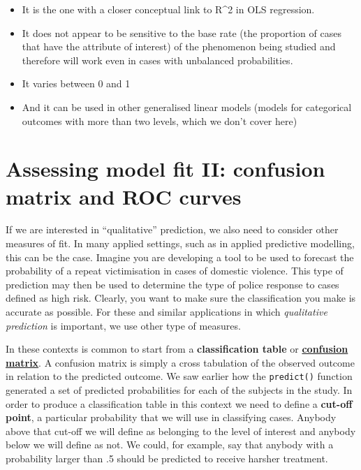 \documentclass[
]{book}
\begin{document}
\begin{itemize}
\item
  It is the one with a closer conceptual link to R\^{}2 in OLS regression.
\item
  It does not appear to be sensitive to the base rate (the proportion of cases that have the attribute of interest) of the phenomenon being studied and therefore will work even in cases with unbalanced probabilities.
\item
  It varies between 0 and 1
\item
  And it can be used in other generalised linear models (models for categorical outcomes with more than two levels, which we don't cover here)
\end{itemize}

\hypertarget{assessing-model-fit-ii-confusion-matrix-and-roc-curves}{%
\section{Assessing model fit II: confusion matrix and ROC curves}\label{assessing-model-fit-ii-confusion-matrix-and-roc-curves}}

If we are interested in ``qualitative'' prediction, we also need to consider other measures of fit. In many applied settings, such as in applied predictive modelling, this can be the case. Imagine you are developing a tool to be used to forecast the probability of a repeat victimisation in cases of domestic violence. This type of prediction may then be used to determine the type of police response to cases defined as high risk. Clearly, you want to make sure the classification you make is accurate as possible. For these and similar applications in which \emph{qualitative prediction} is important, we use other type of measures.

In these contexts is common to start from a \textbf{classification table} or \href{http://en.wikipedia.org/wiki/Confusion_matrix}{\textbf{confusion matrix}}. A confusion matrix is simply a cross tabulation of the observed outcome in relation to the predicted outcome. We saw earlier how the \texttt{predict()} function generated a set of predicted probabilities for each of the subjects in the study. In order to produce a classification table in this context we need to define a \textbf{cut-off point}, a particular probability that we will use in classifying cases. Anybody above that cut-off we will define as belonging to the level of interest and anybody below we will define as not. We could, for example, say that anybody with a probability larger than .5 should be predicted to receive harsher treatment.
\end{document}
